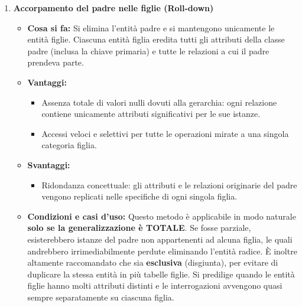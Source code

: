 \documentclass[12pt]{report}
\begin{document}
\begin{enumerate}
		\item \textbf{Accorpamento del padre nelle figlie (Roll-down)}
		\begin{itemize}
			\item \textbf{Cosa si fa:} Si elimina l'entità padre e si mantengono unicamente le entità figlie. Ciascuna entità figlia eredita tutti gli attributi della classe padre (inclusa la chiave primaria) e tutte le relazioni a cui il padre prendeva parte.
			\item \textbf{Vantaggi:}
			\begin{itemize}
				\item Assenza totale di valori nulli dovuti alla gerarchia: ogni relazione contiene unicamente attributi significativi per le sue istanze.
				\item Accessi veloci e selettivi per tutte le operazioni mirate a una singola categoria figlia.
			\end{itemize}
			\item \textbf{Svantaggi:}
			\begin{itemize}
				\item Ridondanza concettuale: gli attributi e le relazioni originarie del padre vengono replicati nelle specifiche di ogni singola figlia.
			\end{itemize}
			\item \textbf{Condizioni e casi d'uso:} 
			Questo metodo è applicabile in modo naturale \textbf{solo se la generalizzazione è TOTALE}. Se fosse parziale, esisterebbero istanze del padre non appartenenti ad alcuna figlia, le quali andrebbero irrimediabilmente perdute eliminando l'entità radice. È inoltre altamente raccomandato che sia \textbf{esclusiva} (disgiunta), per evitare di duplicare la stessa entità in più tabelle figlie. Si predilige quando le entità figlie hanno molti attributi distinti e le interrogazioni avvengono quasi sempre separatamente su ciascuna figlia.
		\end{itemize}
		

\end{enumerate}
\end{document}

